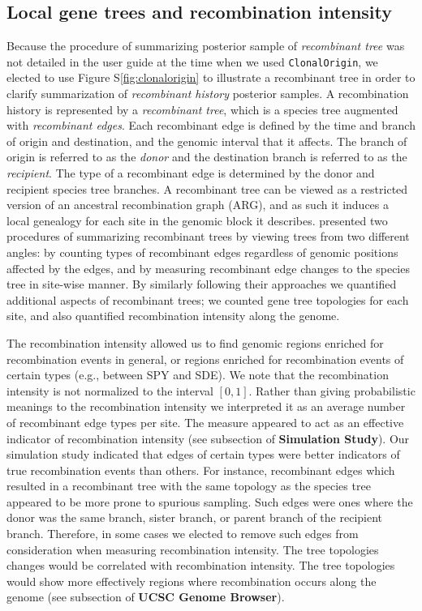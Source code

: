 \documentclass[english]{article}
\begin{document}
\subsection{Local gene trees and recombination intensity}
Because the procedure of summarizing posterior sample of \textit{recombinant
tree} was not detailed in the user guide at the time when we used
\texttt{ClonalOrigin}, we elected to use Figure S\ref{fig:clonalorigin} to
illustrate a recombinant tree in order to clarify summarization of
\textit{recombinant history} posterior samples.  A recombination history is
represented by a \textit{recombinant tree}, which is a species tree augmented
with \textit{recombinant edges}.  Each recombinant edge is defined by the time
and branch of origin and destination, and the genomic interval that it affects.
The branch of origin is referred to as the \textit{donor} and the destination
branch is referred to as the \textit{recipient}. The type of a recombinant edge
is determined by the donor and recipient species tree branches.  A recombinant
tree can be viewed as a restricted version of an ancestral recombination graph
(ARG), and as such it induces a local genealogy for each site in the genomic
block it describes.  \citet{Didelot2010} presented two procedures of summarizing
recombinant trees by viewing trees from two different angles: by counting types
of recombinant edges regardless of genomic positions affected by the edges, and
by measuring recombinant edge changes to the species tree in site-wise manner.
By similarly following their approaches we quantified additional aspects of
recombinant trees; we counted gene tree topologies for each site, and also
quantified recombination intensity along the genome.

The recombination intensity allowed us to find genomic regions enriched for
recombination events in general, or regions enriched for recombination events of
certain types (e.g., between SPY and SDE).  We note that the recombination
intensity is not normalized to the interval $[0,1]$. Rather than giving
probabilistic meanings to the recombination intensity we interpreted it as an
average number of recombinant edge types per site.  The measure appeared to act
as an effective indicator of recombination intensity (see subsection of
\textbf{Simulation Study}).  Our simulation study indicated that edges of
certain types were better indicators of true recombination events than others.
For instance, recombinant edges which resulted in a recombinant tree with the
same topology as the species tree appeared to be more prone to spurious
sampling.  Such edges were ones where the donor was the same branch, sister
branch, or parent branch of the recipient branch.  Therefore, in some cases we
elected to remove such edges from consideration when measuring recombination
intensity.  The tree topologies changes would be correlated with recombination
intensity.  The tree topologies would show more effectively regions where
recombination occurs along the genome (see subsection of \textbf{UCSC Genome
Browser}).
\end{document}
